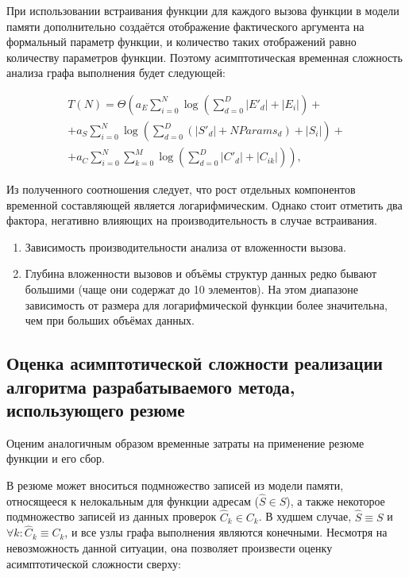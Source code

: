 При использовании встраивания функции для каждого вызова функции в модели памяти дополнительно создаётся отображение фактического аргумента на формальный параметр функции, и количество таких отображений равно количеству параметров функции. Поэтому асимптотическая временная сложность анализа графа выполнения будет следующей:

\begin{equation}
\label{eq:inlining-full}
\begin{split}
 T(N) = \Theta \left( a_E \sum_{i=0}^N \log \left(\sum_{d = 0}^D |E'_d| + |E_i| \right) + \right. \\
 + a_S \sum_{i=0}^N \log \left(\sum_{d = 0}^D \left(|S'_d| + NParams_d \right) + |S_i|\right)+ \\
 + \left.a_C \sum_{i=0}^N \sum_{k=0}^M  \log \left(\sum_{d = 0}^D |C'_d|  + |C_{ik}|  \right) \right),
 \end{split}
\end{equation}

Из полученного соотношения следует, что рост отдельных компонентов временной составляющей является логарифмическим. Однако стоит отметить два фактора, негативно влияющих на производительность в случае встраивания.

\begin{enumerate}
 \item Зависимость производительности анализа от вложенности вызова.
 \item Глубина вложенности вызовов и объёмы структур данных редко бывают большими (чаще они содержат до 10 элементов). На этом диапазоне зависимость от размера для логарифмической функции более значительна, чем при больших объёмах данных.
\end{enumerate}


\subsection{Оценка асимптотической сложности реализации алгоритма разрабатываемого метода, использующего резюме}

Оценим аналогичным образом временные затраты на применение резюме функции и его сбор.

В резюме может вноситься подмножество записей из модели памяти, относящееся к нелокальным для функции адресам ($\widehat{S} \in S$), а также некоторое подмножество записей из данных проверок $\widehat{C}_k \in C_k$. В худшем случае, $\widehat{S} \equiv S$ и $\forall k: \widehat{C}_k \equiv C_k$, и все узлы графа выполнения являются конечными. Несмотря на невозможность данной ситуации, она позволяет произвести оценку асимптотической сложности сверху:

